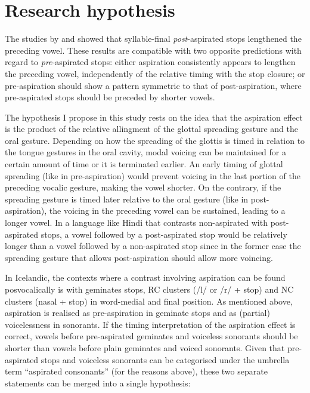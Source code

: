 \documentclass[11pt,a4paper,openany]{memoir}\usepackage[]{graphicx}\usepackage[]{color}
\begin{document}
\section{Research hypothesis}
\label{s:hypothesis}

The studies by \citet{maddieson1976} and \citet{durvasula2012} showed that syllable-final \textit{post}-aspirated stops lengthened the preceding vowel.
These results are compatible with two opposite predictions with regard to \textit{pre}-aspirated stops: either aspiration consistently appears to lengthen the preceding vowel, independently of the relative timing with the stop closure; or pre-aspiration should show a pattern symmetric to that of post-aspiration, where pre-aspirated stops should be preceded by shorter vowels.

The hypothesis I propose in this study rests on the idea that the aspiration effect is the product of the relative allingment of the glottal spreading gesture and the oral gesture.
Depending on how the spreading of the glottis is timed in relation to the tongue gestures in the oral cavity, modal voicing can be maintained for a certain amount of time or it is terminated earlier.
An early timing of glottal spreading (like in pre-aspiration) would prevent voicing in the last portion of the preceding vocalic gesture, making the vowel shorter.
On the contrary, if the spreading gesture is timed later relative to the oral gesture (like in post-aspiration), the voicing in the preceding vowel can be sustained, leading to a longer vowel.
In a language like Hindi that contrasts non-aspirated with post-aspirated stops, a vowel followed by a post-aspirated stop would be relatively longer than a vowel followed by a non-aspirated stop since in the former case the spreading gesture that allows post-aspiration should allow more voincing.

In Icelandic, the contexts where a contrast involving aspiration can be found posvocalically is with geminates stops, RC clusters (/l/ or /r/ + stop) and NC clusters (nasal + stop) in word-medial and final position.
As mentioned above, aspiration is realised as pre-aspiration in geminate stops and as (partial) voicelessness in sonorants.
If the timing interpretation of the aspiration effect is correct, vowels before pre-aspirated geminates and voiceless sonorants should be shorter than vowels before plain geminates and voiced sonorants.
Given that pre-aspirated stops and voiceless sonorants can be categorised under the umbrella term ``aspirated consonants'' (for the reasons above), these two separate statements can be merged into a single hypothesis:
\end{document}
